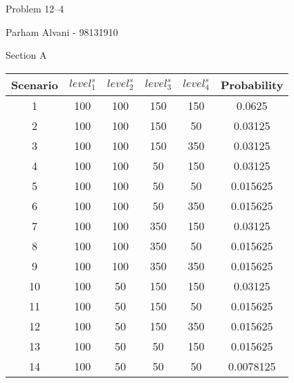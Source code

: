 \documentclass{article}
\begin{document}
\large %


{\Large Problem 12--4 %
\hfill  }

\begin{center}
{\Large Parham Alvani - 98131910} %
\end{center}
\vspace{0.05in}

\begin{center}
        \large Section A
\end{center}

\begin{table}[ht]
        \centering
        \begin{tabular}{|c|c c c c|c|}
                \hline
                Scenario & \(level_{1}^{s}\) & \(level_{2}^{s}\) & \(level_{3}^{s}\) & \(level_{4}^{s}\) & Probability\\
                \hline
                1 & 100 & 100 & 150 & 150 & 0.0625\\\hline
                2 & 100 & 100 & 150 & 50 & 0.03125\\\hline
                3 & 100 & 100 & 150 & 350 & 0.03125\\\hline
                4 & 100 & 100 & 50 & 150 & 0.03125\\\hline
                5 & 100 & 100 & 50 & 50 & 0.015625\\\hline
                6 & 100 & 100 & 50 & 350 & 0.015625\\\hline
                7 & 100 & 100 & 350 & 150 & 0.03125\\\hline
                8 & 100 & 100 & 350 & 50 & 0.015625\\\hline
                9 & 100 & 100 & 350 & 350 & 0.015625\\\hline
                10 & 100 & 50 & 150 & 150 & 0.03125\\\hline
                11 & 100 & 50 & 150 & 50 & 0.015625\\\hline
                12 & 100 & 50 & 150 & 350 & 0.015625\\\hline
                13 & 100 & 50 & 50 & 150 & 0.015625\\\hline
                14 & 100 & 50 & 50 & 50 & 0.0078125\\\hline

\end{tabular}
\end{table}
\end{document}
